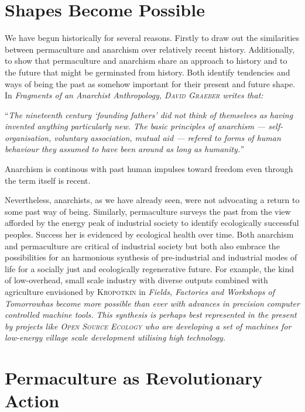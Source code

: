 \documentclass[a4paper, 11pt]{article}
\begin{document}
\begin{multicols*}{2}
\section*{Shapes Become Possible}
We have begun historically for several reasons.  Firstly to draw out the similarities between permaculture and anarchism over relatively recent history.  Additionally, to show that permaculture and anarchism share an approach to history and to the future that might be germinated from history.  Both identify tendencies and ways of being the past as somehow important for their present and future shape.  In \em{Fragments of an Anarchist Anthropology}\em, \textsc{David Graeber} writes that:

\vspace{1mm}
``\em{The nineteenth century `founding fathers' did not think of themselves as having invented anything particularly new.  The basic principles of anarchism --- self-organisation, voluntary association, mutual aid --- refered to forms of human behaviour they assumed to have been around as long as humanity.}\em''
\vspace{1mm}

Anarchism is continous with past human impulses toward freedom even through the term itself is recent.

Nevertheless, anarchists, as we have already seen, were not advocating a return to some past way of being.  Similarly, permaculture surveys the past from the view afforded by the energy peak of industrial society to identify ecologically successful peoples.  Success her is evidenced by ecological health over time.  Both anarchism and permaculture are critical of industrial society but both also embrace the possibilities for an harmonious synthesis of pre-industrial and industrial modes of life for a socially just and ecologically regenerative future.  For example, the kind of low-overhead, small scale industry with diverse outputs combined with agriculture envisioned by \textsc{Kropotkin} in \em{Fields, Factories and Workshops of Tomorrow}\em has become more possible than ever with advances in precision computer controlled machine tools.  This synthesis is perhaps best represented in the present by projects like \textsc{Open Source Ecology} who are developing a set of machines for low-energy village scale development utilising high technology.

\section*{Permaculture as Revolutionary Action}


\end{multicols*}
\end{document}
